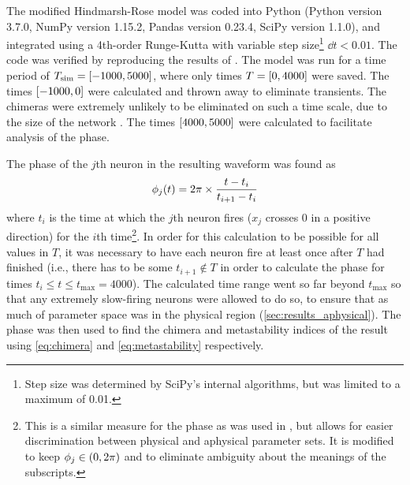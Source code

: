 The modified Hindmarsh-Rose model was coded into Python (Python version 3.7.0, NumPy version 1.15.2, Pandas version 0.23.4, SciPy version 1.1.0), and integrated using a 4th-order Runge-Kutta with variable step size\footnote{Step size was determined by SciPy's internal algorithms, but was limited to a maximum of 0.01.} $\dd{t} < 0.01$.
The code was verified by reproducing the results of \cite{Santos2017}.
The model was run for a time period of $T_{\text{sim}} = \bqty{-1000, 5000}$, where only times $T = \bqty{0, 4000}$ were saved.
The times $\bqty{-1000, 0}$ were calculated and thrown away to eliminate transients.
The chimeras were extremely unlikely to be eliminated on such a time scale, due to the size of the network \cite{Wolfrum2011}.
The times $\bqty{4000, 5000}$ were calculated to facilitate analysis of the phase.

The phase of the $j$th neuron in the resulting waveform was found as
\begin{equation}
  \label{eq:hr_phase}
  \phi_{j}(t)
  =
  2 \pi \times \frac{t - t_{i}}{t_{i + 1} - t_{i}}
\end{equation}
where $t_{i}$ is the time at which the $j$th neuron fires ($x_{j}$ crosses 0 in a positive direction) for the $i$th time\footnote{This is a similar measure for the phase as was used in \cite{Santos2017}, but allows for easier discrimination between physical and aphysical parameter sets.
  It is modified to keep $\phase_{j} \in \pqty{0, 2\pi}$ and to eliminate ambiguity about the meanings of the subscripts.
}.
In order for this calculation to be possible for all values in $T$, it was necessary to have each neuron fire at least once after $T$ had finished (i.e., there has to be some $t_{i + 1} \notin T$ in order to calculate the phase for times $t_{i} \leq t \leq t_{\text{max}} = 4000$).
The calculated time range went so far beyond $t_{\text{max}}$ so that any extremely slow-firing neurons were allowed to do so, to ensure that as much of parameter space was in the physical region (\cref{sec:results_aphysical}).
The phase was then used to find the chimera and metastability indices of the result using \cref{eq:chimera} and \cref{eq:metastability} respectively.

